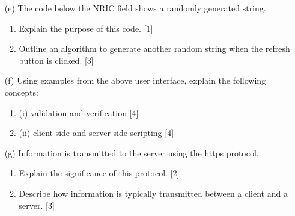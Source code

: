 \begin{enumerate}
\item[(e)]  The code below the NRIC field shows a randomly generated string. 
\begin{enumerate}
\item Explain the purpose of this code. \hfill{}{[}1{]}
\item Outline an algorithm to generate another random string when the refresh
button is clicked.\hfill{} {[}3{]}
\end{enumerate}
\item[(f)]  Using examples from the above user interface, explain the following
concepts: 
\begin{enumerate}
\item (i) validation and verification \hfill{}{[}4{]}
\item (ii) client-side and server-side scripting \hfill{}{[}4{]}
\end{enumerate}
\item[(g)]  Information is transmitted to the server using the https protocol.
\begin{enumerate}
\item Explain the significance of this protocol.\hfill{} {[}2{]}
\item Describe how information is typically transmitted between a client
and a server. \hfill{}{[}3{]}
\end{enumerate}
\end{enumerate}